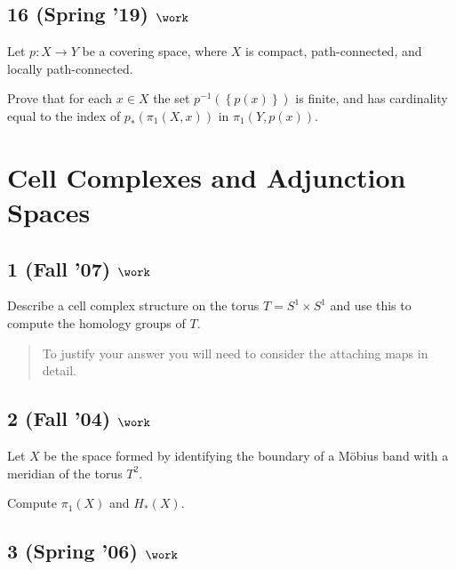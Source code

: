\hypertarget{spring-19-work}{%
\subsection{\texorpdfstring{16 (Spring '19)
\(\work\)}{16 (Spring '19) \textbackslash work}}\label{spring-19-work}}

Let \(p : X \to Y\) be a covering space, where \(X\) is compact,
path-connected, and locally path-connected.

Prove that for each \(x \in X\) the set
\(p^{-1}(\left\{{p(x)}\right\})\) is finite, and has cardinality equal
to the index of \(p_* (\pi_1 (X, x))\) in \(\pi_1 (Y, p(x))\).

\hypertarget{cell-complexes-and-adjunction-spaces}{%
\section{Cell Complexes and Adjunction
Spaces}\label{cell-complexes-and-adjunction-spaces}}

\hypertarget{fall-07-work}{%
\subsection{\texorpdfstring{1 (Fall '07)
\(\work\)}{1 (Fall '07) \textbackslash work}}\label{fall-07-work}}

Describe a cell complex structure on the torus \(T = S^1 \times S^1\)
and use this to compute the homology groups of \(T\).

\begin{quote}
To justify your answer you will need to consider the attaching maps in
detail.
\end{quote}

\hypertarget{fall-04-work-3}{%
\subsection{\texorpdfstring{2 (Fall '04)
\(\work\)}{2 (Fall '04) \textbackslash work}}\label{fall-04-work-3}}

Let \(X\) be the space formed by identifying the boundary of a Möbius
band with a meridian of the torus \(T^2\).

Compute \(\pi_1 (X)\) and \(H_* (X)\).

\hypertarget{spring-06-work-3}{%
\subsection{\texorpdfstring{3 (Spring '06)
\(\work\)}{3 (Spring '06) \textbackslash work}}\label{spring-06-work-3}}

